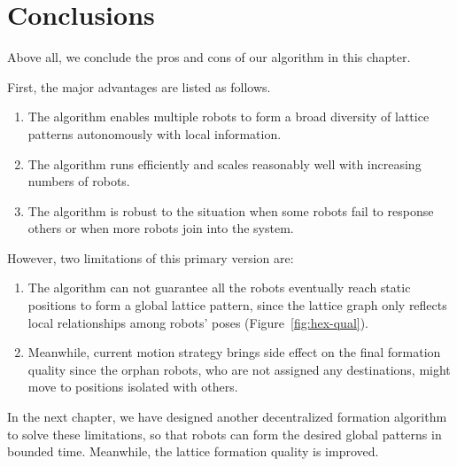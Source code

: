 \section{Conclusions} 
\label{sec:conc-mrf1}
Above all, we conclude the pros and cons of our algorithm in this chapter.

First, the major advantages are listed as follows.
\begin{enumerate}
\item The algorithm enables multiple robots to form a broad diversity of lattice patterns autonomously with local information.
\item The algorithm runs efficiently and scales reasonably well with increasing numbers of robots.
\item The algorithm is robust to the situation when some robots fail to response others or when more robots join into the system.
\end{enumerate}


However, two limitations of this primary version are:
\begin{enumerate}
\item The algorithm can not guarantee all the robots eventually reach static positions to form a global lattice pattern, since the lattice graph only reflects local relationships among robots' poses (Figure~\ref{fig:hex-qual}).
\item Meanwhile, current motion strategy brings side effect on the final formation quality since the orphan robots, who are not assigned any destinations, might move to positions isolated with others.
\end{enumerate}

In the next chapter, we have designed another decentralized formation algorithm to solve these limitations, so that robots can form the desired global patterns in bounded time. 
Meanwhile, the lattice formation quality is improved.